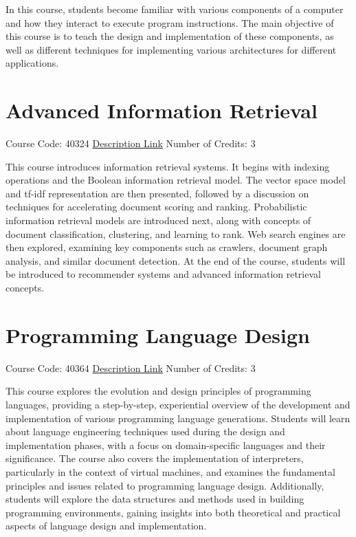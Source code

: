 \documentclass[
fontsize=11pt,
paper=a4,
parskip=half,
enlargefirstpage=off,    %
fromalign=right,        %
fromphone=on,           %
fromemail=on,
fromrule=off,           %
addrfield=off,          %
backaddress=on,         %
subject=beforeopening,  %
locfield=narrow,        %
foldmarks=off,          %
open=any
]{scrartcl}
\begin{document}
In this course, students become familiar with various components of a computer and how they interact to execute program instructions. The main objective of this course is to teach the design and implementation of these components, as well as different techniques for implementing various architectures for different applications.

\section{Advanced Information Retrieval}
Course Code: 40324 \qquad \quad \href{https://docs.ce.sharif.edu/course/40324}{Description Link}
\qquad \quad Number of Credits: 3

This course introduces information retrieval systems. It begins with indexing operations and the Boolean information retrieval model. The vector space model and tf-idf representation are then presented, followed by a discussion on techniques for accelerating document scoring and ranking. Probabilistic information retrieval models are introduced next, along with concepts of document classification, clustering, and learning to rank. Web search engines are then explored, examining key components such as crawlers, document graph analysis, and similar document detection. At the end of the course, students will be introduced to recommender systems and advanced information retrieval concepts.

\section{Programming Language Design}
Course Code: 40364 \qquad \quad \href{https://docs.ce.sharif.edu/course/40364}{Description Link}
\qquad \quad Number of Credits: 3

This course explores the evolution and design principles of programming languages, providing a step-by-step, experiential overview of the development and implementation of various programming language generations. Students will learn about language engineering techniques used during the design and implementation phases, with a focus on domain-specific languages and their significance. The course also covers the implementation of interpreters, particularly in the context of virtual machines, and examines the fundamental principles and issues related to programming language design. Additionally, students will explore the data structures and methods used in building programming environments, gaining insights into both theoretical and practical aspects of language design and implementation.
\end{document}
